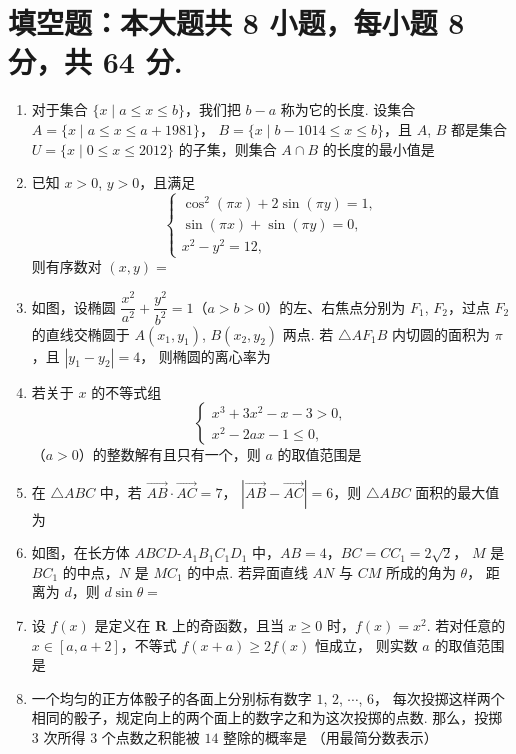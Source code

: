 \documentclass{chsmc}
\begin{document}
\section{填空题：本大题共 8 小题，每小题 8 分，共 64 分.}

\begin{enumerate}
	\item 对于集合 $\{x\mid a \leqslant x \leqslant b\}$，我们把 $b-a$ 称为它的长度.
		设集合 $A = \{x\mid a \leqslant x \leqslant a+1981\}$，
		$B = \{x\mid b-1014 \leqslant x \leqslant b\}$，且 $A$, $B$ 都是集合
		$U = \{x\mid 0 \leqslant x \leqslant 2012\}$ 的子集，则集合 $A \cap B$
		的长度的最小值是 \blankline
	\item 已知 $x > 0$, $y > 0$，且满足
		\[\begin{cases}
		\cos^2(\pi x) + 2\sin(\pi y) = 1, \\
		\sin(\pi x) + \sin(\pi y) = 0, \\
		x^2 - y^2 = 12,
		\end{cases}\]
		则有序数对 $(x,y) =$ \blankline
	\item 如图，设椭圆 $\dfrac{x^2}{a^2} + \dfrac{y^2}{b^2} = 1$（$a > b > 0$）的左、右焦点分别为
		$F_1$, $F_2$，过点 $F_2$ 的直线交椭圆于 $A(x_1,y_1)$, $B(x_2,y_2)$ 两点.
		若 $\triangle AF_1B$ 内切圆的面积为 $\pi$，且 $|y_1-y_2| = 4$，
		则椭圆的离心率为 \blankline
	\item 若关于 $x$ 的不等式组
		$$
		\begin{cases}
		x^3 + 3x^2 - x - 3 > 0, \\
		x^2 - 2ax - 1 \leqslant 0,
		\end{cases}
		$$
		（$a > 0$）的整数解有且只有一个，则 $a$ 的取值范围是 \blankline
	\item 在 $\triangle ABC$ 中，若 $\overrightarrow{AB}\cdot\overrightarrow{AC} = 7$，
		$|\overrightarrow{AB} - \overrightarrow{AC}| = 6$，则 $\triangle ABC$ 面积的最大值为 \blankline
	\item 如图，在长方体 $ABCD$-$A_1B_1C_1D_1$ 中，$AB = 4$，$BC = CC_1 = 2\sqrt{2}$，
		$M$ 是 $BC_1$ 的中点，$N$ 是 $MC_1$ 的中点. 若异面直线 $AN$ 与 $CM$ 所成的角为 $\theta$，
		距离为 $d$，则 $d\sin\theta =$ \blankline
	\item 设 $f(x)$ 是定义在 $\mathbf{R}$ 上的奇函数，且当 $x \geqslant 0$ 时，$f(x) = x^2$.
		若对任意的 $x \in [a,a+2]$，不等式 $f(x+a) \geqslant 2f(x)$ 恒成立，
		则实数 $a$ 的取值范围是 \blankline
	\item 一个均匀的正方体骰子的各面上分别标有数字 $1$, $2$, $\cdots$, $6$，
		每次投掷这样两个相同的骰子，规定向上的两个面上的数字之和为这次投掷的点数.
		那么，投掷 $3$ 次所得 $3$ 个点数之积能被 $14$ 整除的概率是 \blankline（用最简分数表示）
\end{enumerate}
\end{document}
